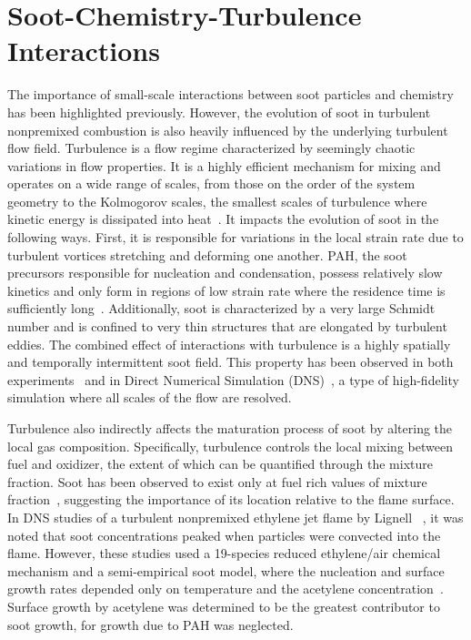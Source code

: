 \section{Soot-Chemistry-Turbulence Interactions}
\label{sec:intro:scti}

The importance of small-scale interactions between soot particles and chemistry has been highlighted previously. However, the evolution of soot in turbulent nonpremixed combustion is also heavily influenced by the underlying turbulent flow field. Turbulence is a flow regime characterized by seemingly chaotic variations in flow properties. It is a highly efficient mechanism for mixing and operates on a wide range of scales, from those on the order of the system geometry to the Kolmogorov scales, the smallest scales of turbulence where kinetic energy is dissipated into heat~\cite{pope2000}. It impacts the evolution of soot in the following ways. First, it is responsible for variations in the local strain rate due to turbulent vortices stretching and deforming one another. PAH, the soot precursors responsible for nucleation and condensation, possess relatively slow kinetics and only form in regions of low strain rate where the residence time is sufficiently long~\cite{bisetti2012,attili2014,attili2015}. Additionally, soot is characterized by a very large Schmidt number and is confined to very thin structures that are elongated by turbulent eddies. The combined effect of interactions with turbulence is a highly spatially and temporally intermittent soot field. This property has been observed in both experiments~\cite{lee2009,qamar2009,narayanaswamy2013,mahmoud2015} and in Direct Numerical Simulation (DNS)~\cite{lignell2007,lignell2008,bisetti2012,attili2014,attili2015}, a type of high-fidelity simulation where all scales of the flow are resolved.

Turbulence also indirectly affects the maturation process of soot by altering the local gas composition. Specifically, turbulence controls the local mixing between fuel and oxidizer, the extent of which can be quantified through the mixture fraction. Soot has been observed to exist only at fuel rich values of mixture fraction~\cite{bisetti2012,attili2014,mahmoud2015,park2017}, suggesting the importance of its location relative to the flame surface. In DNS studies of a turbulent nonpremixed ethylene jet flame by Lignell \etal~\cite{lignell2007,lignell2008}, it was noted that soot concentrations peaked when particles were convected into the flame. However, these studies used a 19-species reduced ethylene/air chemical mechanism and a semi-empirical soot model, where the nucleation and surface growth rates depended only on temperature and the acetylene concentration~\cite{leung1991}. Surface growth by acetylene was determined to be the greatest contributor to soot growth, for growth due to PAH was neglected.


